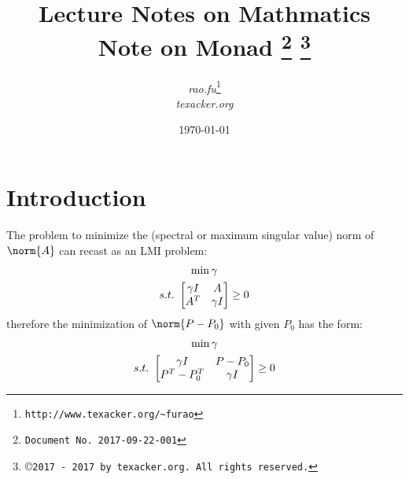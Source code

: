\documentclass{article}
\begin{document}


\title{\textbf{Lecture Notes on Mathmatics} \\[1em] Note on Monad
{\footnote{\texttt{Document No. 2017-09-22-001}}}
{\footnote{\copyright \texttt{2017 - 2017 by texacker.org. All rights reserved.}}}
}

\author{%
\small{\textit{rao.fu}}\thanks{\texttt{http://www.texacker.org/\~{}furao}} \\ \small{\textit{texacker.org}}
}
\date{\today}

\maketitle

\section{Introduction}
The problem to minimize the (spectral or maximum singular value) norm of $\norm{A}$
can recast as an LMI problem:
\begin{gather}
\min \gamma \\
s.t.\,\,
\begin{bmatrix}
\gamma I & A \\
A^T      & \gamma I
\end{bmatrix}
\ge 0 \notag
\end{gather}
therefore the minimization of $\norm{P - P_0}$ with given $P_0$
has the form:
\begin{gather}
\min \gamma \\
s.t.\,\,
\begin{bmatrix}
\gamma I    & P - P_0 \\
P^T - P_0^T & \gamma I
\end{bmatrix}
\ge 0 \notag
\end{gather}
\end{document}
